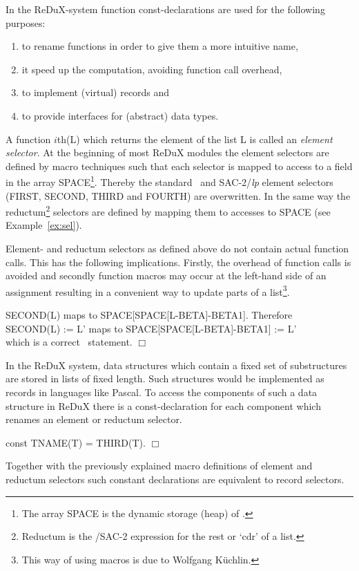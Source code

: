 In the ReDuX-system function const-declarations are used for the following 
purposes:
\begin{enumerate}
 \item to rename functions in order to give them a more intuitive name,
 \item it speed up the computation, avoiding function call overhead,
 \item to implement (virtual) records and
 \item to provide interfaces for (abstract) data types.
\end{enumerate}
A function $i$th(L) which returns the  element of
the list L is called an {\em {} element selector}.
At the beginning of most ReDuX modules the  element selectors are 
defined by macro techniques such that each selector is mapped to access to
a field in the array SPACE\footnote{The array SPACE is the dynamic storage 
(heap) of \ALDES.}.
Thereby the standard \ALDES\ and SAC-2/{\it lp} element selectors 
(FIRST, SECOND,
THIRD and FOURTH) are overwritten.
In the same way the  reductum\footnote{Reductum is the \ALDES/SAC-2 
expression for the rest or `cdr' of a list.} selectors are defined by mapping 
them to accesses to SPACE  (see Example~\ref{ex:sel}).

Element- and reductum selectors as defined above do not contain actual 
function calls.
This has the following implications.
Firstly, the overhead of function calls is avoided and secondly 
function macros may occur at the left-hand side of an assignment resulting 
in a convenient way to update parts of a list\footnote{This way of using 
macros is due to Wolfgang K\"{u}chlin.}.
\begin{example}
  SECOND(L) maps to SPACE[SPACE[L-BETA]-BETA1]. Therefore \\
  SECOND(L) := L' maps to SPACE[SPACE[L-BETA]-BETA1] := L' \\
  which is a correct \ALDES\ statement. \hfill $\Box$
\end{example}

In the ReDuX system, data structures which contain a fixed set of 
substructures are stored in lists of fixed length.
Such structures would be implemented as records in languages like Pascal.
To access the components of such a data structure in ReDuX there is a 
const-declaration for each component which renames an  element or
reductum selector.
\begin{example} const TNAME(T) = THIRD(T). \hfill $\Box$
\end{example}
Together with the previously explained macro definitions of element and
reductum selectors such constant declarations are equivalent to
record selectors.

